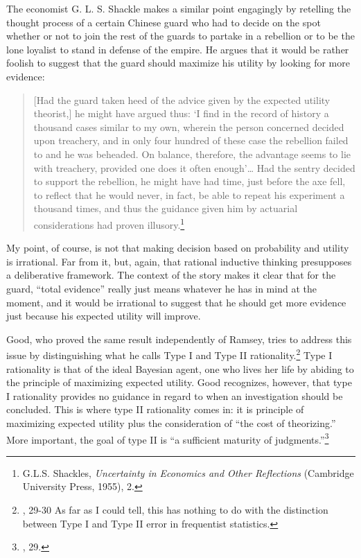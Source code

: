 The economist G. L. S. Shackle makes a similar point engagingly by
retelling the thought process of a certain Chinese guard who had to
decide on the spot whether or not to join the rest of the guards to
partake in a rebellion or to be the lone loyalist to stand in defense of
the empire. He argues that it would be rather foolish to suggest that
the guard should maximize his utility by looking for more evidence:

\begin{quote}
{[}Had the guard taken heed of the advice given by the expected utility
theorist,{]} he might have argued thus: `I find in the record of history
a thousand cases similar to my own, wherein the person concerned decided
upon treachery, and in only four hundred of these case the rebellion
failed to and he was beheaded. On balance, therefore, the advantage
seems to lie with treachery, provided one does it often enough'\ldots{}
Had the sentry decided to support the rebellion, he might have had time,
just before the axe fell, to reflect that he would never, in fact, be
able to repeat his experiment a thousand times, and thus the guidance
given him by actuarial considerations had proven illusory.\footnote{G.L.S.
  Shackles, \emph{Uncertainty in Economics and Other Reflections}
  (Cambridge University Press, 1955), 2.}
\end{quote}

My point, of course, is not that making decision based on probability
and utility is irrational. Far from it, but, again, that rational
inductive thinking presupposes a deliberative framework. The context of
the story makes it clear that for the guard, ``total evidence'' really
just means whatever he has in mind at the moment, and it would be
irrational to suggest that he should get more evidence just because his
expected utility will improve.

Good, who proved the same result independently of Ramsey, tries to
address this issue by distinguishing what he calls Type I and Type II
rationality.\footnote{\cite{goodthinking}, 29-30 As far as I
  could tell, this has nothing to do with the distinction between Type I
  and Type II error in frequentist statistics.} Type I rationality is
that of the ideal Bayesian agent, one who lives her life by abiding to
the principle of maximizing expected utility. Good recognizes, however,
that type I rationality provides no guidance in regard to when an
investigation should be concluded. This is where type II rationality
comes in: it is principle of maximizing expected utility plus the
consideration of ``the cost of theorizing.'' More important, the goal of
type II is ``a sufficient maturity of judgments.''\footnote{\cite{goodthinking}, 29.}

